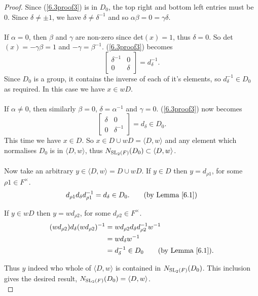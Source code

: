 \begin{proof}
    Since (\ref{6.3proof3}) is in $D_0$, the top right and bottom left entries must be 0. Since  $\delta \neq \pm 1$, we have $\delta \neq \delta^{-1}$ and so $\alpha \beta = 0 = \gamma \delta$. \\
    \\
     \space If $\alpha = 0$, then $\beta$ and $\gamma$ are non-zero since det$(x) = 1$, thus $\delta = 0$. So det$(x) = - \gamma \beta = 1$  and $- \gamma = \beta^{-1}$. (\ref{6.3proof3}) becomes $$\begin{bmatrix} \delta^{-1} & 0 \\ 0 & \delta \end{bmatrix} = d^{-1}_\delta.$$Since $D_0$ is a group, it contains the inverse of each of it's elements, so $d^{-1}_\delta \in D_0$ as required. In this case we have $x \in wD$. \\
    \\
     \space If $\alpha \neq 0$, then similarly $\beta = 0$, $\delta = \alpha^{-1}$ and $\gamma = 0$. (\ref{6.3proof3}) now becomes $$\begin{bmatrix} \delta & 0 \\ 0 & \delta^{-1} \end{bmatrix} = d_\delta \in D_0.$$This time we have $x \in D$. So $x \in D \cup wD = \langle D , w \rangle$ and any element which normalises $D_0$ is in $\langle D , w \rangle$, thus $N_{\operatorname{SL}_2(F)}(D_0) \subset \langle D , w \rangle$. \\
    \\
    Now take an arbitrary $y \in \langle D , w \rangle = D \cup wD$. If $y \in D$ then $y = d_{\rho 1}$, for some $\rho 1 \in F^\times$.
    \begin{align*} d_{\rho 1} d_\delta d^{-1}_{\rho 1} = d_\delta \in D_0. \tag{by Lemma \ref{6.1}}
    \end{align*}
    
    If $y \in wD$ then $y = w d_{\rho 2}$, for some $ d_{\rho 2} \in F^\times$.
    \begin{align*} (w d_{\rho 2}) d_\delta (w d_{\rho 2})^{-1} &= w d_{\rho 2} d_\delta d^{-1}_{\rho 2} w^{-1}
    \\ &= w d_\delta w^{-1}
    \\ &= d^{-1}_\delta \in D_0 \tag{by Lemma \ref{6.1}}.
    \end{align*}
    
    Thus $y$ indeed who whole of $\langle D , w \rangle$ is contained in $N_{\operatorname{SL}_2(F)}(D_0)$. This inclusion gives the desired result, $N_{\operatorname{SL}_2(F)}(D_0) = \langle D , w \rangle$. \\
    
\end{proof}
